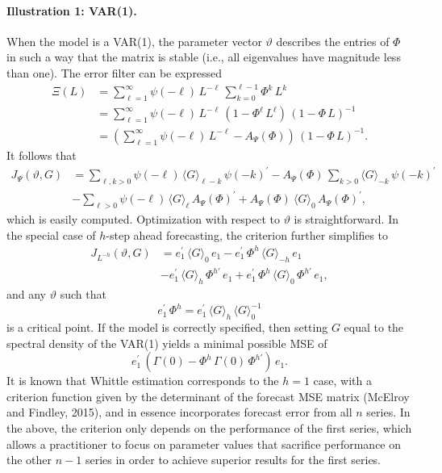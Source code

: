 \documentclass[a4paper]{book}
\begin{document}
\vspace{.5cm}

\paragraph{Illustration 1: VAR(1).}  When the model is a VAR(1), the parameter vector $\vartheta$
 describes the entries of $\Phi$ in such a way that the matrix is stable (i.e., all eigenvalues
 have magnitude less than one).  The error filter can be 
 expressed
\begin{align*}
    \Xi (L) & =   \sum_{\ell =1 }^{\infty} \psi (-\ell) \,  L^{-\ell} \,
   \sum_{k=0}^{\ell-1} \Phi^k \, L^k \\
  & =  \sum_{\ell =1 }^{\infty} \psi (-\ell) \,  L^{-\ell} \,
   \left( 1 - \Phi^{\ell} \, L^{\ell} \right) \, {( 1 - \Phi \, L )}^{-1} \\
 & =  \left( \sum_{\ell =1 }^{\infty} \psi (-\ell) \,  L^{-\ell} -
    A_{\Psi} (\Phi) \right)  
    \, {( 1 - \Phi \, L )}^{-1}.
\end{align*}
  It follows that 
\begin{align*}
 J_{\Psi} (\vartheta, G) & = \sum_{\ell,k > 0} \psi (-\ell) \, {\langle G \rangle}_{\ell-k} \, 
	{\psi (-k)}^{\prime} - A_{\Psi} (\Phi) \, \sum_{k > 0} {\langle G \rangle}_{-k} 
	\, {\psi (-k)}^{\prime}  \\
  & - \sum_{\ell > 0} \psi (-\ell) \, { \langle G \rangle }_{\ell} \, 
	{ A_{\Psi} (\Phi) }^{\prime} + { A_{\Psi} (\Phi) }^{} \, { \langle G \rangle }_0 \,
 { A_{\Psi} (\Phi) }^{\prime},
\end{align*}
 which is easily computed.  Optimization with respect to $\vartheta$ is straightforward.
 In the special case of $h$-step ahead forecasting, the criterion further simplifies to
\begin{align*}
  J_{ L^{-h}} (\vartheta, G) & = 
  e_1^{\prime} \, { \langle G \rangle }_0 \, e_1 - e_1^{\prime} \, \Phi^h \, { \langle G \rangle}_{-h} 
	\, e_1 \\
 & - e_1^{\prime} \, {\langle G \rangle }_h \, {\Phi}^{h \prime} \, e_1
	+ e_1^{\prime} \, \Phi^h \, { \langle G \rangle }_0 \, {\Phi}^{h \prime} \, e_1,
\end{align*}
 and any $\vartheta$ such that
\[
  e_1^{\prime} \, \Phi^h = e_1^{\prime} \, { \langle G \rangle }_h \, { \langle G \rangle }_0^{-1}
\]
 is a critical point.  If the model is correctly specified, then setting $G$ equal to the spectral
 density of the VAR(1) yields a minimal possible MSE of
\[
   e_1^{\prime} \, \left( \Gamma (0) - \Phi^h \, \Gamma (0) \, {\Phi}^{h \prime} \right) \, e_1.
\]
 It is known that Whittle estimation corresponds to the $h=1$ case, with a criterion function given
 by the determinant of the forecast MSE matrix (McElroy and Findley, 2015), and in essence
 incorporates forecast error from all $n$ series.  In the above, the criterion only depends on the
 performance of the first series, which allows a practitioner to focus on parameter values
 that sacrifice performance on the other $n-1$ series in order to achieve superior results for
 the first series.
\end{document}
